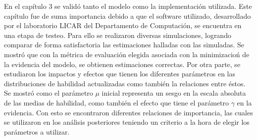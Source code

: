 \documentclass[11pt,twoside,spanish]{report} %
\begin{document}
En el cap\'itulo 3 se valid\'o tanto el modelo como la implementaci\'on utilizada.
Este cap\'itulo fue de suma importancia debido a que el software utilizado, desarrollado por el laboratorio LICAR del Departamento de Computaci\'on, se encuentra en una etapa de testeo.
Para ello se realizaron diversas simulaciones, logrando comparar de forma satisfactoria las estimaciones halladas con las simuladas.
Se mostr\'o que con la m\'etrica de evaluaci\'on elegida asociada con la minimizacio\'n de la evidencia del modelo, se obtienen estimaciones correctas.
Por otra parte, se estudiaron los impactos y efectos que tienen los diferentes par\'ametros en las distribuciones de habilidad actualizadas como tambi\'en la relaciones entre \'estos.
Se mostr\'o  como el par\'ametro $\mu$ inicial representa un sesgo en la escala absoluta de las medias de habilidad, como tambi\'en el efecto que tiene el par\'ametro $\gamma$ en la evidencia.
Con esto se encontraron diferentes relaciones de importancia, las cuales se utilizaron en los an\'alisis posteriores teniendo un criterio a la hora de elegir los par\'ametros a utilizar.
\end{document}
